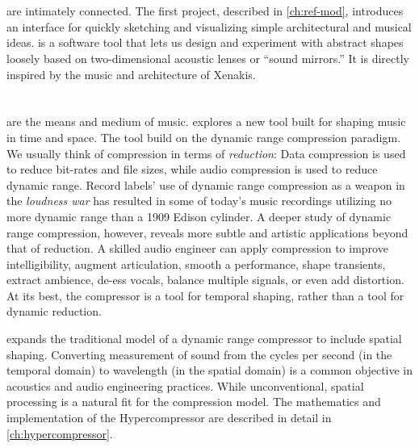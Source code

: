 \section{}
\label{sec:refmod-intro}
 are intimately connected. The first
project, described in \autoref{ch:ref-mod}, introduces an interface
for quickly sketching and visualizing simple architectural and musical
ideas.  is a software tool that lets us design and experiment
with abstract shapes loosely based on two-dimensional acoustic lenses
or ``sound mirrors.'' It is directly inspired by the music and
architecture of Xenakis.

\section{\thesis}
\label{sec:hypercompression-intro}
 are the means and medium of music. \thesis
explores a new tool built for shaping music in time and space. The
tool build on the dynamic range compression paradigm.  We usually
think of compression in terms of \emph{reduction}: Data compression is
used to reduce bit-rates and file sizes, while audio compression is
used to reduce dynamic range. Record labels' use of dynamic range
compression as a weapon in the \emph{loudness
  war}\cite{Deruty2014a} has resulted in some of today's music
recordings utilizing no more dynamic range than a 1909 Edison
cylinder.\cite{Katz2007} A deeper study of dynamic range compression,
however, reveals more subtle and artistic applications beyond that of
reduction. A skilled audio engineer can apply compression to improve
intelligibility, augment articulation, smooth a performance, shape
transients, extract ambience, de-ess vocals, balance multiple signals,
or even add distortion.\cite{Case2007} At its best, the compressor is
a tool for temporal shaping, rather than a tool for dynamic reduction.

\thesis expands the traditional model of a dynamic range compressor to
include spatial shaping.  Converting measurement of sound from the
cycles per second (in the temporal domain) to wavelength (in the
spatial domain) is a common objective in acoustics and audio
engineering practices.\cite{Davis1989} While unconventional, spatial
processing is a natural fit for the compression model. The mathematics
and implementation of the Hypercompressor are described in detail in
\autoref{ch:hypercompressor}.

